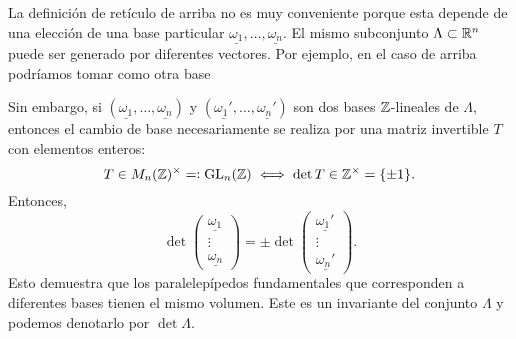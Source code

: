 \documentclass{article}
\numberwithin{equation}{section}
\begin{document}
\begin{center}
\end{center}

La definición de retículo de arriba no es muy conveniente porque esta depende de
una elección de una base particular
$\underline{\omega_1},\ldots,\underline{\omega_n}$. El mismo subconjunto
$\Lambda \subset \mathbb{R}^n$ puede ser generado por diferentes vectores. Por ejemplo,
en el caso de arriba podríamos tomar como otra base

\begin{center}
\end{center}

Sin embargo, si $(\underline{\omega_1},\ldots,\underline{\omega_n})$ y
$(\underline{\omega_1'},\ldots,\underline{\omega_n'})$ son dos bases
$\mathbb{Z}$-lineales de $\Lambda$, entonces el cambio de base necesariamente se
realiza por una matriz invertible $T$ con elementos enteros:
$$T \in M_n (\mathbb{Z})^\times =\mathrel{\mathop:} \operatorname{GL}_n (\mathbb{Z}) \iff \det T \in \mathbb{Z}^\times = \{ \pm 1 \}.$$
Entonces,
\[ \det \begin{pmatrix}
    \underline{\omega_1} \\
    \vdots \\
    \underline{\omega_n}
  \end{pmatrix} = \pm \det \begin{pmatrix}
    \underline{\omega_1'} \\
    \vdots \\
    \underline{\omega_n'}
  \end{pmatrix}. \]
Esto demuestra que los paralelepípedos fundamentales que corresponden a
diferentes bases tienen el mismo volumen. Este es un invariante del conjunto
$\Lambda$ y podemos denotarlo por $\det \Lambda$.
\end{document}
